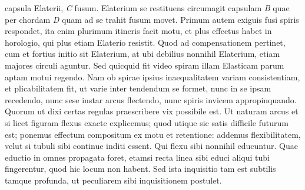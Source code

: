    \clearpage
\pstart  {}
{} capsula Elaterii\protect{}, \textit{C} fusum\protect{}. Elaterium\protect{} se restituens circumagit capsulam \textit{B} quae per chordam \textit{D} quam ad se trahit fusum movet. Primum autem exiguis fusi spiris respondet, ita enim plurimum itineris facit motu, et plus effectus habet in horologio\protect{}, qui plus etiam Elaterio\protect{} resistit. Quod ad compensationem pertinet, cum et fortius initio sit Elaterium\protect{}, at ubi debilius nonnihil Elaterium\protect{}, etiam majores circuli aguntur.
\pend
\pstart Sed quicquid fit video spiram illam Elasticam parum aptam motui regendo. Nam ob spirae ipsius inaequalitatem variam consistentiam, et plicabilitatem fit, ut varie inter tendendum se formet, nunc in se ipsam recedendo, nunc sese instar arcus flectendo, nunc spiris invicem appropinquando. Quorum ut dixi certas regulas praescribere vix possibile est. Ut naturam arcus\protect{} et si licet figuram flexus exacte explicemus; quod utique sic satis difficile futurum est; ponemus effectum compositum ex motu et retentione: addemus flexibilitatem, velut si tubuli sibi continue inditi essent. Qui flexu sibi nonnihil educuntur. Quae eductio in omnes propagata foret, etamsi recta linea sibi educi aliqui tubi fingerentur, quod hic locum non habent. Sed ista inquisitio tam est subtilis tamque profunda, ut peculiarem sibi inquisitionem postulet.%
